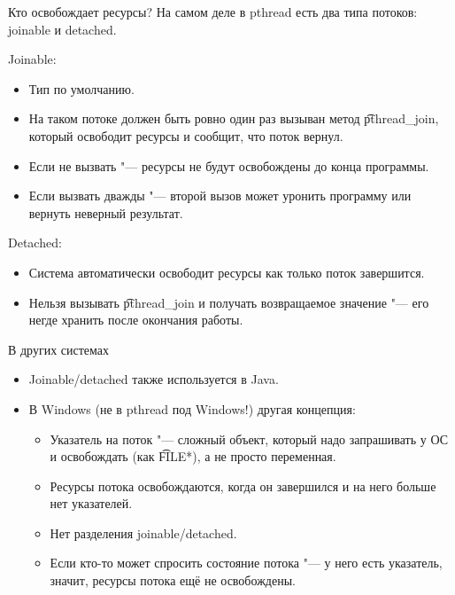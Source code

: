 \begin{frame}{Кто освобождает ресурсы?}
	На самом деле в pthread есть два типа потоков: joinable и detached.

	Joinable:
	\begin{itemize}
		\item Тип по умолчанию.
		\item На таком потоке должен быть ровно один раз вызыван метод \t{pthread\_join}, который освободит ресурсы и сообщит, что поток вернул.
		\item Если не вызвать "--- ресурсы не будут освобождены до конца программы.
		\item Если вызвать дважды "--- второй вызов может уронить программу или вернуть неверный результат.
	\end{itemize}

	Detached:
	\begin{itemize}
		\item Система автоматически освободит ресурсы как только поток завершится.
		\item Нельзя вызывать \t{pthread\_join} и получать возвращаемое значение "--- его негде хранить после окончания работы.
	\end{itemize}
\end{frame}

\begin{frame}{В других системах}
	\begin{itemize}
		\item Joinable/detached также используется в Java.
		\item В Windows (не в pthread под Windows!) другая концепция:
			\begin{itemize}
				\item Указатель на поток "--- сложный объект, который надо запрашивать у ОС и освобождать (как \t{FILE*}), а не просто переменная.
				\item Ресурсы потока освобождаются, когда он завершился и на него больше нет указателей.
				\item Нет разделения joinable/detached.
				\item Если кто-то может спросить состояние потока "--- у него есть указатель, значит, ресурсы потока ещё не освобождены.
			\end{itemize}
	\end{itemize}
\end{frame}

